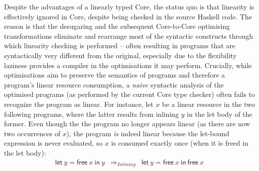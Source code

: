 \documentclass[acmsmall,review,anonymous]{acmart}
\newcommand{\llet}[2]{\mathsf{let}~#1~\mathsf{in}~#2}
\begin{document}

%

Despite the advantages of a linearly typed Core, the status quo is
that linearity is effectively ignored in Core, despite being checked
in the source Haskell code. The reason is that the desugaring
and the subsequent Core-to-Core optimising transformations
eliminate and rearrange most of the syntactic constructs through
which linearity checking is performed -- often resulting in programs
that are syntactically very different from the original, especially
due to the flexibility laziness provides a compiler in the
optimisations it may perform.
%
Crucially, while optimisations aim to preserve the semantics of
programs and therefore a program's linear resource consumption,
a \emph{naive} syntactic analysis of the optimised programs (as
performed by the current Core type checker) often fails to recognize
the program as linear.
%
For instance, let $x$ be a linear resource in the two following programs, where
the latter results from inlining $y$ in the let body of the former. Even though the
the program no longer appears linear (as there are now two 
occurrences of $x$), the program \emph{is} indeed linear
because the let-bound expression is never evaluated, so $x$ is
consumed exactly once (when it is freed in the let body):
%
\[
\begin{array}{ccc}
\llet{y = \textsf{free}~x}{y} & \Longrightarrow_{Inlining} & \llet{y = \textsf{free}~x}{\textsf{free}~x}
\end{array}
\]
\end{document}
